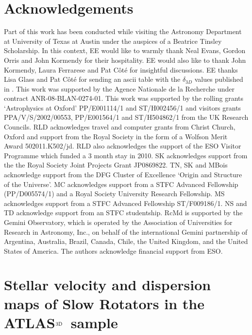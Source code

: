 \documentclass[useAMS,usenatbib,usegraphicx]{mn2e}
\newcommand{\atlas}{{ATLAS$^{\rm 3D}$}}
\begin{document}
\section*{Acknowledgements}
Part of this work has been conducted while visiting the Astronomy Department at University of Texas at Austin under the auspices of a Beatrice Tinsley Scholarship. In this context, EE would like to warmly thank Neal Evans, Gordon Orris and John Kormendy for their hospitality. EE would also like to thank John Kormendy, Laura Ferrarese and Pat C\^ot\'e for insightful discussions. EE thanks Lisa Glass and Pat C\^ot\'e for sending an ascii table with the $\delta_{3D}$ values published in \cite{Glass+10}.
This work was supported by the Agence Nationale de la Recherche under contract ANR-08-BLAN-0274-01.
This work was supported by the rolling grants `Astrophysics at Oxford' PP/E001114/1 and ST/H002456/1 
and visitors grants PPA/V/S/2002/00553, PP/E001564/1 and ST/H504862/1 from the UK Research Councils. 
RLD acknowledges travel and computer grants from Christ Church, Oxford and support from the Royal Society 
in the form of a Wolfson Merit Award 502011.K502/jd. RLD also acknowledges the support of the ESO Visitor Programme which funded a 3 month stay in 2010.
SK acknowledges support from the the Royal Society Joint Projects Grant JP0869822.
TN, SK and MBois acknowledge support from the DFG Cluster of Excellence  `Origin and Structure of the Universe'.
MC acknowledges support from a STFC Advanced Fellowship (PP/D005574/1) and a Royal Society University Research Fellowship.
MS acknowledges support from a STFC Advanced Fellowship ST/F009186/1.
NS and TD acknowledge support from an STFC studentship.
RcMd is supported by the Gemini Observatory, which is operated by the Association
of Universities for Research in Astronomy, Inc., on behalf of the
international Gemini partnership of Argentina, Australia, Brazil, Canada,
Chile, the United Kingdom, and the United States of America.
The authors acknowledge financial support from ESO.




\appendix
%
%
\section{Stellar velocity and dispersion maps of Slow Rotators in the \atlas\ sample}
\label{App:vmaps}
\end{document}
